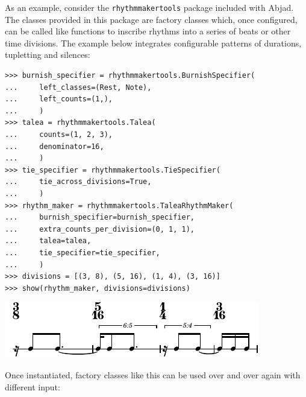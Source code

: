 \documentclass{article}
\begin{document}
As an example, consider the \texttt{rhythmmakertools} package included with
Abjad. The classes provided in this package are factory classes which, once
configured, can be called like functions to inscribe rhythms into a series of
beats or other time divisions. The example below integrates configurable
patterns of durations, tupletting and silences:

\begin{lstlisting}
>>> burnish_specifier = rhythmmakertools.BurnishSpecifier(
...     left_classes=(Rest, Note),
...     left_counts=(1,),
...     )
>>> talea = rhythmmakertools.Talea(
...     counts=(1, 2, 3),
...     denominator=16,
...     )
>>> tie_specifier = rhythmmakertools.TieSpecifier(
...     tie_across_divisions=True,
...     )
>>> rhythm_maker = rhythmmakertools.TaleaRhythmMaker(
...     burnish_specifier=burnish_specifier,
...     extra_counts_per_division=(0, 1, 1),
...     talea=talea,
...     tie_specifier=tie_specifier,
...     )
>>> divisions = [(3, 8), (5, 16), (1, 4), (3, 16)]
>>> show(rhythm_maker, divisions=divisions)
\end{lstlisting}
\noindent\includegraphics{assets/lilypond-c238b5fdf445554d95cebd52911b461e.pdf}

\noindent Once instantiated, factory classes like this can be used over and
over again with different input:

\end{document}
